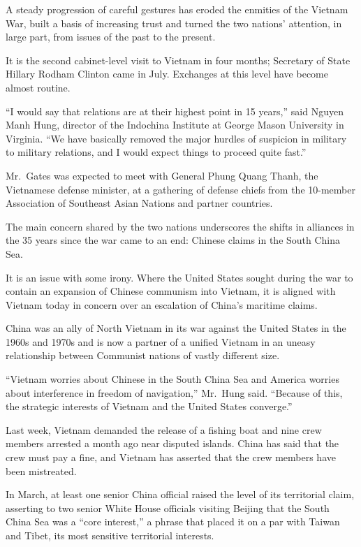 ﻿\documentclass[12pt]{article}
\begin{document}
A steady progression of careful gestures has eroded the enmities of the Vietnam War, built a basis
of increasing trust and turned the two nations' attention, in large part, from issues of the past to
the present.

It is the second cabinet-level visit to Vietnam in four months; Secretary of State Hillary Rodham
Clinton came in July. Exchanges at this level have become almost routine.

``I would say that relations are at their highest point in 15 years,'' said Nguyen Manh Hung,
director of the Indochina Institute at George Mason University in Virginia. ``We have basically
removed the major hurdles of suspicion in military to military relations, and I would expect things
to proceed quite fast.''

Mr.~Gates was expected to meet with General Phung Quang Thanh, the Vietnamese defense minister, at a
gathering of defense chiefs from the 10-member Association of Southeast Asian Nations and partner
countries.

The main concern shared by the two nations underscores the shifts in alliances in the 35 years since
the war came to an end: Chinese claims in the South China Sea.

It is an issue with some irony. Where the United States sought during the war to contain an
expansion of Chinese communism into Vietnam, it is aligned with Vietnam today in concern over an
escalation of China's maritime claims.

China was an ally of North Vietnam in its war against the United States in the 1960s and 1970s and
is now a partner of a unified Vietnam in an uneasy relationship between Communist nations of vastly
different size.

``Vietnam worries about Chinese in the South China Sea and America worries about interference in
freedom of navigation,'' Mr.~Hung said. ``Because of this, the strategic interests of Vietnam and
the United States converge.''

Last week, Vietnam demanded the release of a fishing boat and nine crew members arrested a month ago
near disputed islands. China has said that the crew must pay a fine, and Vietnam has asserted that
the crew members have been mistreated.

In March, at least one senior China official raised the level of its territorial claim, asserting to
two senior White House officials visiting Beijing that the South China Sea was a ``core interest,''
a phrase that placed it on a par with Taiwan and Tibet, its most sensitive territorial interests.
\end{document}
